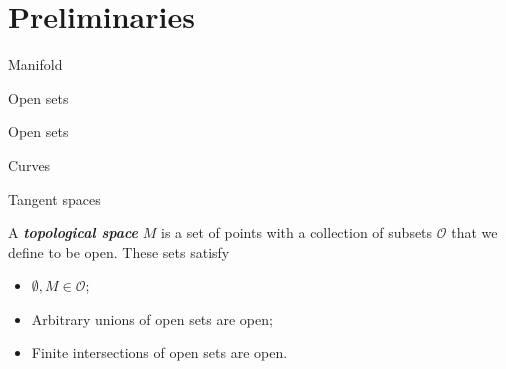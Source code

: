\documentclass[UKenglish]{beamer}
\newcommand\boldgreen[1]{\textcolor{lighter_csu_green}{\emph{\textbf{#1}}}}
\newcommand{\opens}{\mathcal{O}}
\begin{document}
\section{Preliminaries}

\begin{frame}{}
Manifold
\begin{figure}[H]
	\centering
	\def\svgwidth{0.75\columnwidth}
	
\end{figure}
\end{frame}

\begin{frame}{}
Open sets
\begin{figure}[H]
	\centering
	\def\svgwidth{.75\columnwidth}
	
\end{figure}
\end{frame}

\begin{frame}{}
Open sets
\begin{figure}[H]
	\centering
	\def\svgwidth{\columnwidth}
	
\end{figure}
\end{frame}

\begin{frame}{}
Curves
\begin{figure}[H]
	\centering
	\def\svgwidth{0.75\columnwidth}
	
\end{figure}
\end{frame}

\begin{frame}{}
Tangent spaces
\begin{figure}[H]
	\centering
	\def\svgwidth{0.75\columnwidth}
	
\end{figure}
\end{frame}

\begin{frame}{}
	\vfill
	A \boldgreen{topological space} $M$ is a set of points with a collection of subsets $\opens$ that we define to be open. These sets satisfy \pause
	\begin{itemize}
		\item $\emptyset,M \in \opens$;
		\pause
		\item Arbitrary unions of open sets are open;
		\pause
		\item Finite intersections of open sets are open.
	\end{itemize}
	\vfill
\end{frame}
\end{document}
